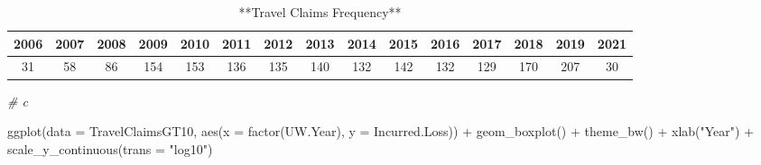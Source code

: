 \documentclass[
]{book}
\newenvironment{Shaded}{\begin{snugshade}}{\end{snugshade}}
\newcommand{\AttributeTok}[1]{\textcolor[rgb]{0.77,0.63,0.00}{#1}}
\newcommand{\CommentTok}[1]{\textcolor[rgb]{0.56,0.35,0.01}{\textit{#1}}}
\newcommand{\DecValTok}[1]{\textcolor[rgb]{0.00,0.00,0.81}{#1}}
\newcommand{\FunctionTok}[1]{\textcolor[rgb]{0.00,0.00,0.00}{#1}}
\newcommand{\NormalTok}[1]{#1}
\newcommand{\OtherTok}[1]{\textcolor[rgb]{0.56,0.35,0.01}{#1}}
\newcommand{\SpecialCharTok}[1]{\textcolor[rgb]{0.00,0.00,0.00}{#1}}
\newcommand{\StringTok}[1]{\textcolor[rgb]{0.31,0.60,0.02}{#1}}
\begin{document}
\begin{Shaded}
\end{Shaded}

\begin{table}

\caption{\label{tab:unnamed-chunk-18}**Travel Claims Frequency**}
\centering
\begin{tabular}[t]{c|c|c|c|c|c|c|c|c|c|c|c|c|c|c}
\hline
2006 & 2007 & 2008 & 2009 & 2010 & 2011 & 2012 & 2013 & 2014 & 2015 & 2016 & 2017 & 2018 & 2019 & 2021\\
\hline
31 & 58 & 86 & 154 & 153 & 136 & 135 & 140 & 132 & 142 & 132 & 129 & 170 & 207 & 30\\
\hline
\end{tabular}
\end{table}

\begin{Shaded}
\begin{Highlighting}[]
\CommentTok{\# c}

\FunctionTok{ggplot}\NormalTok{(}\AttributeTok{data =}\NormalTok{ TravelClaimsGT10, }\FunctionTok{aes}\NormalTok{(}\AttributeTok{x =} \FunctionTok{factor}\NormalTok{(UW.Year), }\AttributeTok{y =}\NormalTok{ Incurred.Loss)) }\SpecialCharTok{+} \FunctionTok{geom\_boxplot}\NormalTok{() }\SpecialCharTok{+}
    \FunctionTok{theme\_bw}\NormalTok{() }\SpecialCharTok{+} \FunctionTok{xlab}\NormalTok{(}\StringTok{"Year"}\NormalTok{) }\SpecialCharTok{+} \FunctionTok{scale\_y\_continuous}\NormalTok{(}\AttributeTok{trans =} \StringTok{"log10"}\NormalTok{)}
\end{Highlighting}
\end{Shaded}
\end{document}
